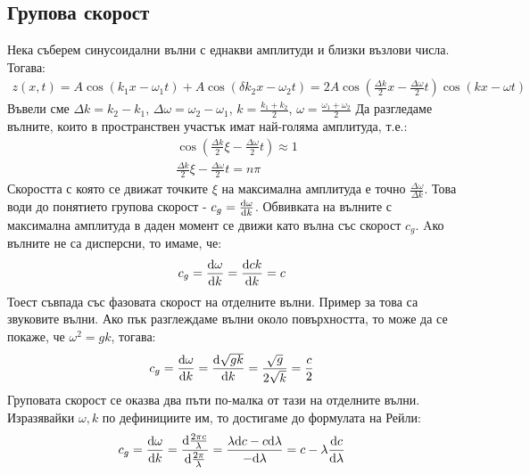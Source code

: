 \subsection{Групова скорост}
Нека съберем синусоидални вълни с еднакви амплитуди и близки възлови числа. Тогава:
\begin{align*}
	z(x, t) = A \cos (k_1 x - \omega_1 t) + A \cos (\delta k_2 x - \omega_2 t) = 2 A \cos (\frac{\Delta k}{2} x - \frac{\Delta \omega}{2} t) \cos (k x - \omega t)
\end{align*}
Въвели сме $\Delta k = k_2 - k_1$, $\Delta \omega = \omega_2 - \omega_1$, $k = \frac {k_1 + k_2}{2}$, $\omega = \frac{\omega_1 + \omega_2}{2}$
Да разгледаме вълните, които в пространствен участък имат най-голяма амплитуда, т.е.:
\begin{align*}
	&\cos (\frac{\Delta k}{2} \xi - \frac{\Delta \omega}{2} t) \approx 1 \\
	&\frac{\Delta k}{2} \xi - \frac{\Delta \omega}{2} t = n \pi
\end{align*}
Скоростта с която се движат точките $\xi$ на максимална амплитуда е точно $\frac{\Delta \omega}{\Delta k}$.
Това води до понятието групова скорост - $c_g = \dv{\omega}{k}$.
Обвивката на вълните с максимална амплитуда в даден момент се движи като вълна със скорост $c_g$.
Aко вълните не са дисперсни, то имаме, че:
\begin{equation*}
	c_g = \dv{\omega}{k} = \dv{c k}{k} = c
\end{equation*}
Тоест съвпада със фазовата скорост на отделните вълни. Пример за това са звуковите вълни.
Ако пък разглеждаме вълни около повърхността, то може да се покаже, че $\omega^2 = g k$, тогава:
\begin{equation*}
	c_g = \dv{\omega}{k} = \dv{\sqrt{g k}}{k} = \frac{\sqrt{g}}{2 \sqrt{k}} = \frac{c}{2}
\end{equation*}
Груповата скорост се оказва два пъти по-малка от тази на отделните вълни.
Изразявайки $\omega, k$ по дефинициите им, то достигаме до формулата на Рейли:
\begin{equation}
	c_g = \dv{\omega}{k} = \dv{\frac{2 \pi c}{\lambda}}{\frac{2 \pi}{\lambda}} = \frac{\lambda \dd c - c \dd \lambda}{- \dd \lambda} = c - \lambda \dv{c}{\lambda}
\end{equation}


